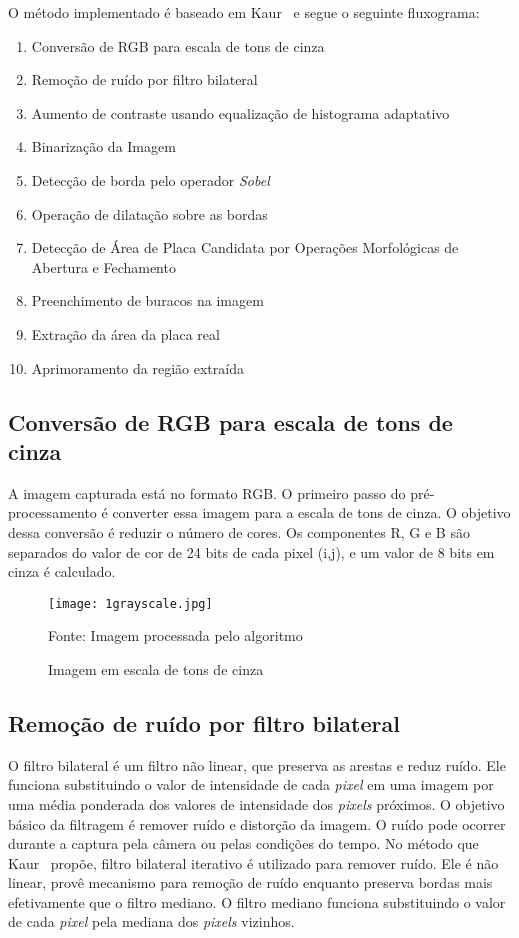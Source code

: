 O método implementado é baseado em Kaur~\cite{kaur2014efficient} e segue o seguinte fluxograma:

\begin{enumerate}
	\item Conversão de RGB para escala de tons de cinza
	\item Remoção de ruído por filtro bilateral
	\item Aumento de contraste usando equalização de histograma adaptativo
	\item Binarização da Imagem
	\item Detecção de borda pelo operador \emph{Sobel}
    \item Operação de dilatação sobre as bordas
	\item Detecção de Área de Placa Candidata por Operações Morfológicas de Abertura e Fechamento
    \item Preenchimento de buracos na imagem
	\item Extração da área da placa real
    \item Aprimoramento da região extraída
\end{enumerate}

\subsection{Conversão de RGB para escala de tons de cinza}

A imagem capturada está no formato RGB\@. O primeiro passo do pré-processamento é
converter essa imagem para a escala de tons de cinza. O objetivo dessa conversão é reduzir
o número de cores. Os componentes R, G e B são separados do valor de cor de 24
bits de cada pixel (i,j), e um valor de 8 bits em cinza é calculado.

\begin{figure}[H]
	\centering
	\texttt{[image: 1grayscale.jpg]}
	\caption{Imagem em escala de tons de cinza}
Fonte: Imagem processada pelo algoritmo
	\label{fig:ext_gray_scale}
\end{figure}

\subsection{Remoção de ruído por filtro bilateral}

O filtro bilateral é um filtro não linear, que preserva as arestas e reduz ruído. Ele funciona substituindo o valor de intensidade de cada \emph{pixel} em uma imagem por uma média ponderada dos valores de intensidade dos \emph{pixels} próximos. O objetivo básico da filtragem é remover ruído e distorção da imagem. O ruído pode ocorrer durante a captura pela câmera ou pelas condições do tempo. No método que Kaur~\cite{kaur2014efficient} propõe, filtro bilateral iterativo é utilizado para remover ruído. Ele é não linear, provê mecanismo para remoção de ruído enquanto preserva bordas mais efetivamente que o filtro mediano. O filtro mediano funciona substituindo o valor de cada \emph{pixel} pela mediana dos \emph{pixels} vizinhos.

